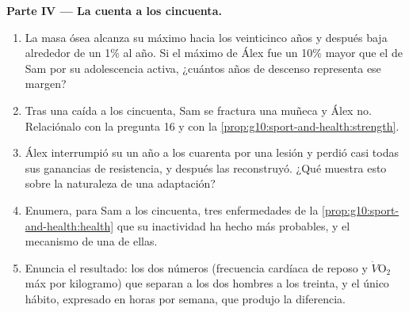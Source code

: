 \begin{problem}
\medskip
\noindent\textbf{Parte IV --- La cuenta a los cincuenta.}
\begin{enumerate}[resume]
  \item La masa ósea alcanza su máximo hacia los veinticinco años y
        después baja alrededor de un 1\% al año. Si el máximo de Álex
        fue un 10\% mayor que el de Sam por su adolescencia activa,
        ¿cuántos años de descenso representa ese margen?
  \item Tras una caída a los cincuenta, Sam se fractura una muñeca y
        Álex no. Relaciónalo con la pregunta 16 y con la
        \cref{prop:g10:sport-and-health:strength}.
  \item Álex interrumpió su  un año a los cuarenta por una
        lesión y perdió casi todas sus ganancias de resistencia, y
        después las reconstruyó. ¿Qué muestra esto sobre la naturaleza
        de una adaptación?
  \item Enumera, para Sam a los cincuenta, tres enfermedades de la
        \cref{prop:g10:sport-and-health:health} que su inactividad ha
        hecho más probables, y el mecanismo de una de ellas.
  \item Enuncia el resultado: los dos números (frecuencia cardíaca de
        reposo y $\dot V\!\mathrm{O_2}$máx por kilogramo) que separan a
        los dos hombres a los treinta, y el único hábito, expresado en
        horas por semana, que produjo la diferencia.
\end{enumerate}
\end{problem}
